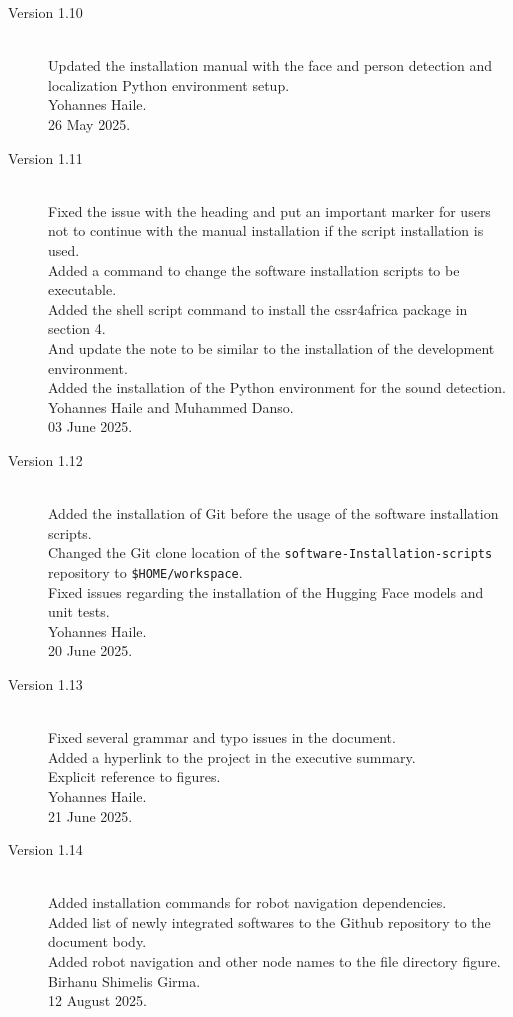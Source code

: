 \documentclass{CSSRforAfrica}
\begin{document}
{\begin{description}
\item [Version 1.10]~\\
Updated the installation manual with the face and person detection and localization Python environment setup.\\
Yohannes Haile.\\    
26 May 2025.

\item [Version 1.11]~\\
Fixed the issue with the heading and put an important marker for users not to continue with the manual installation if the script installation is used. \\
Added a command to change the software installation scripts to be executable.\\
Added the shell script command to install the cssr4africa package in section 4.\\
And update the note to be similar to the installation of the development environment. \\
Added the installation of the Python environment for the sound detection. \\
Yohannes Haile and Muhammed Danso.\\
03 June 2025.

\item [Version 1.12]~\\
Added the installation of Git before the usage of the software installation scripts.\\
Changed the Git clone location of the \texttt{software-Installation-scripts} repository to \texttt{\$HOME/workspace}.\\
Fixed issues regarding the installation of the Hugging Face models and unit tests.\\
Yohannes Haile.\\
20 June 2025.

\item [Version 1.13]~\\
Fixed several grammar and typo issues in the document.\\
Added a hyperlink to the project in the executive summary.\\
Explicit reference to figures.\\
Yohannes Haile.\\
21 June 2025.

\item [Version 1.14]~\\
Added installation commands for robot navigation dependencies.\\
Added list of newly integrated softwares to the Github repository to the document body.\\
Added robot navigation and other node names to the file directory figure.\\
Birhanu Shimelis Girma.\\
12 August 2025.


\end{description}}
\end{document}
